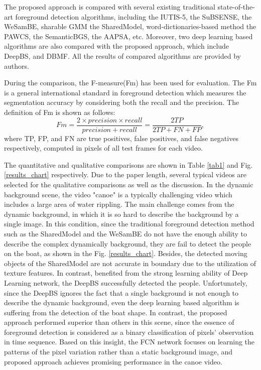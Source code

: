 \documentclass[journal]{IEEEtran}
\newcommand{\reffig}[1]{Fig. \ref{#1}}
\newcommand{\reftab}[1]{Table \ref{#1}}
\begin{document}
The proposed approach is compared with several existing traditional state-of-the-art foreground detection algorithms, including the IUTIS-5\cite{Bianco2017TEC}, the SuBSENSE\cite{St-Charles2015SuBSENSE}, the WeSamBE\cite{Jiang2017WeSamBE}, sharable GMM the SharedModel\cite{Chen2015SharedModel}, word-dictionaries-based method the PAWCS\cite{Charles2015PAWCS}, the SemanticBGS\cite{Braham2017Semantic}, the AAPSA\cite{RAMIREZALONSO2016990}, etc. 
Moreover, two deep learning based algorithms are also compared with the proposed approach, which include DeepBS\cite{Babaee2017deep}, and DBMF\cite{Yang2018DBMF}. 
All the results of compared algorithms are provided by authors.

During the comparison, the F-measure(Fm) has been used for evaluation. 
The Fm is a general international standard in foreground detection which measures the segmentation accuracy by considering both the recall and the precision. 
The definition of Fm is shown as follows:
\begin{equation}
Fm= \frac{2\times precision \times recall}{precision + recall} = \frac{2TP}{2TP+FN+FP},
\end{equation}
% 
% 
%
where TP, FP, and FN are true positives, false positives, and false negatives respectively, computed in pixels of all test frames for each video. 


The quantitative and qualitative comparisons are shown in \reftab{tab1} and  \reffig{results_chart} respectively. 
Due to the paper length, several typical videos are selected for the qualitative comparisons as well as the discussion. 
In the dynamic background scene, the video "canoe" is a typically challenging video which includes a large area of water rippling. 
The main challenge comes from the dynamic background, in which it is so hard to describe the background by a single image. 
In this condition, since the traditional foreground detection method such as the SharedModel and the WeSamBE do not have the enough ability to describe the complex dynamically background, they are fail to detect the people on the boat, as shown in the \reffig{results_chart}. 
Besides, the detected moving objects of the SharedModel are not accurate in boundary due to the utilization of texture features. 
In contrast, benefited from the strong learning ability of Deep Learning network, the DeepBS successfully detected the people. 
Unfortunately, since the DeepBS ignores the fact that a single background is not enough to describe the dynamic background, even the deep learning based algorithm is suffering from the detection of the boat shape. 
In contrast, the proposed approach performed superior than others in this scene, since the essence of foreground detection is considered as a binary classification of pixels' observation in time sequence. 
Based on this insight, the FCN network focuses on learning the patterns of the pixel variation rather than a static background image, and proposed approach achieves promising performance in the canoe video.
\end{document}
